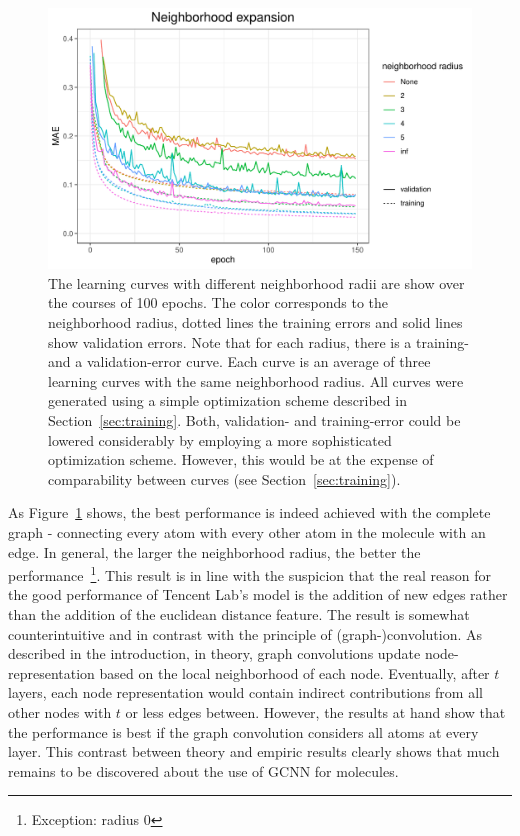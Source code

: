 \begin{figure}[H]
	\includegraphics[width=\linewidth]{figures/neighborhood-expansion}
	
	\caption{The learning curves with different neighborhood radii are show over the courses of 100 epochs. The color corresponds to the neighborhood radius, dotted lines the training errors and solid lines show validation errors. Note that for each radius, there is a training- and a validation-error curve. Each curve is an average of three learning curves with the same neighborhood radius. All curves were generated using a simple optimization scheme described in Section~\ref{sec:training}. Both, validation- and training-error could be lowered considerably by employing a more sophisticated optimization scheme. However, this would be at the expense of comparability between curves (see Section~\ref{sec:training}).}
	\label{fig:neighborhood-expansion}
\end{figure}

As Figure~\ref{fig:neighborhood-expansion} shows, the best performance is indeed achieved with the complete graph - connecting every atom with every other atom in the molecule with an edge. In general, the larger the neighborhood radius, the better the performance~\footnote{Exception: radius 0}. This result is in line with the suspicion that the real reason for the good performance of Tencent Lab's model is the addition of new edges rather than the addition of the euclidean distance feature.
The result is somewhat counterintuitive and in contrast with the principle of (graph-)convolution. As described in the introduction, in theory, graph convolutions update node-representation based on the local neighborhood of each node. Eventually, after $t$ layers, each node representation would contain indirect contributions from all other nodes with $t$ or less edges between. However, the results at hand show that the performance is best if the graph convolution considers all atoms at every layer. This contrast between theory and empiric results clearly shows that much remains to be discovered about the use of GCNN for molecules.


